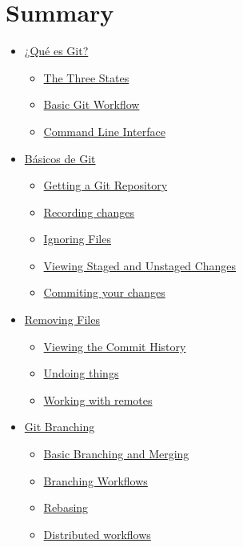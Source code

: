 \hypertarget{summary}{%
\section{Summary}\label{summary}}

\begin{itemize}
\tightlist
\item
  \href{./1_intro.md}{¿Qué es Git?}

  \begin{itemize}
  \tightlist
  \item
    \href{./states.md}{The Three States}
  \item
    \href{./basic_git_workflow.md}{Basic Git Workflow}
  \item
    \href{./command_line_interface.md}{Command Line Interface}
  \end{itemize}
\item
  \href{./2_basico.md}{Básicos de Git}

  \begin{itemize}
  \tightlist
  \item
    \href{./repos.md}{Getting a Git Repository}
  \item
    \href{./recording_changes.md}{Recording changes}
  \item
    \href{./ignoring_files.md}{Ignoring Files}
  \item
    \href{./staged_changes.md}{Viewing Staged and Unstaged Changes}
  \item
    \href{./commiting_changes.md}{Commiting your changes}
  \end{itemize}
\item
  \href{./remove_files.md}{Removing Files}

  \begin{itemize}
  \tightlist
  \item
    \href{./Commit_History.md}{Viewing the Commit History}
  \item
    \href{./undoing_things.md}{Undoing things}
  \item
    \href{./working_remotes.md}{Working with remotes}
  \end{itemize}
\item
  \href{./Git_Branching.md}{Git Branching}

  \begin{itemize}
  \tightlist
  \item
    \href{./branching_and_merging.md}{Basic Branching and Merging}
  \item
    \href{./branching_Workflow.md}{Branching Workflows}
  \item
    \href{./rebasing.md}{Rebasing}
  \item
    \href{./distributed_Workflows.md}{Distributed workflows}
  \end{itemize}
\end{itemize}
